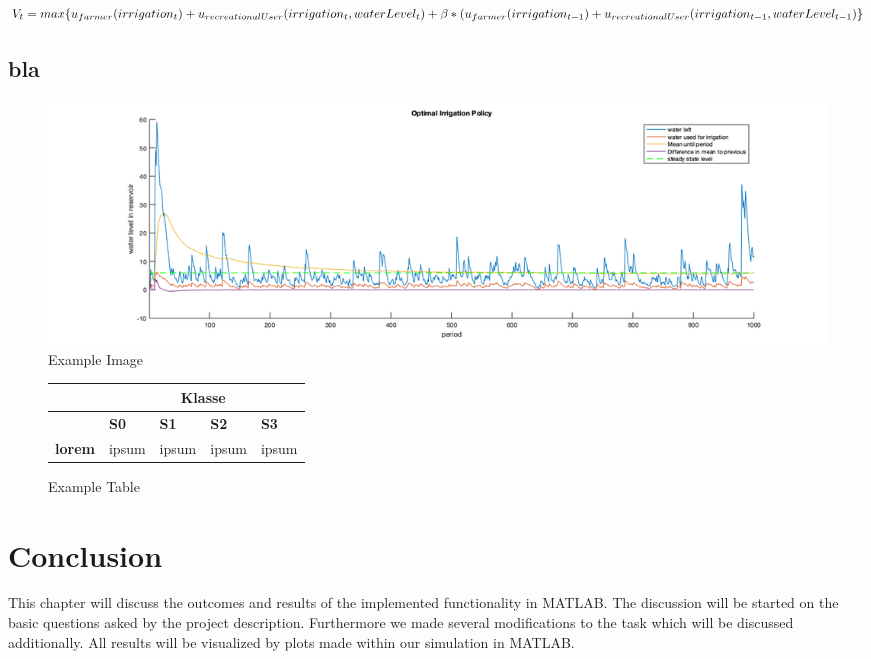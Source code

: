 \documentclass[12pt, a4paper, oneside]{article}
\begin{document}
	
	\begin{dmath}
	V_t =  max\{u_{farmer}(irrigation_t) + u_{recreationalUser}(irrigation_t, waterLevel_t) \\
		
	+ 	\beta*(u_{farmer}(irrigation_{t-1}) + u_{recreationalUser}(irrigation_{t-1}, waterLevel_{t-1})\}
	\end{dmath}

	\subsection{bla}
	\begin{figure}[ht] %
		\includegraphics[width=1\textwidth]{figures/example.png}
		\caption{Example Image}
		\label{fig:example-pic}
	\end{figure}
	\blindtext
	\begin{figure}[ht] %
		\begin{longtable}{|p{2,5cm}|p{}|p{}|p{3cm}|p{3cm}|}
			\hline
			&\multicolumn{4}{c|}{\textbf{Klasse}} \\
			\hline
			& \textbf{S0} & \textbf{S1} & \textbf{S2} & \textbf{S3} \\
			\hline
			\textbf{lorem} & ipsum & ipsum & ipsum & ipsum \\
			\hline
		\end{longtable}
		\label{fig:example-figure}
		\caption{Example Table}
	\end{figure}
	\blindtext
	\blindtext
	\blindtext
	
	
	\section{Conclusion}
	This chapter will discuss the outcomes and results of the implemented functionality in MATLAB.
	The discussion will be started on the basic questions asked by the project description.
	Furthermore we made several modifications to the task which will be discussed additionally.
	All results will be visualized by plots made within our simulation in MATLAB.
\end{document}
